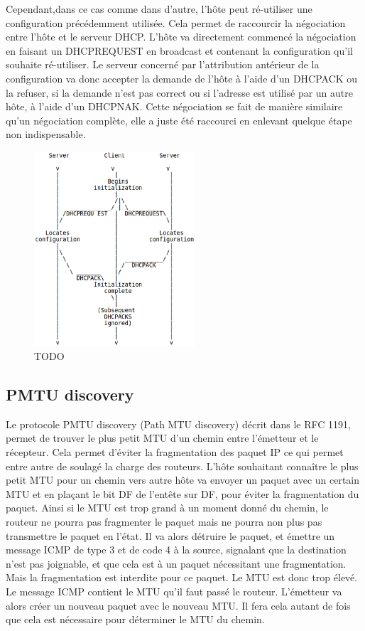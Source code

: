 Cependant,dans ce cas comme dans d'autre, l'hôte peut ré-utiliser une
configuration précédemment utilisée. Cela permet de raccourcir la négociation
entre l'hôte et le serveur DHCP. L'hôte va directement commencé la négociation
en faisant un DHCPREQUEST en broadcast et contenant la configuration qu'il
souhaite ré-utiliser. Le serveur concerné par l'attribution antérieur de la
configuration va donc accepter la demande de l'hôte à l'aide d'un DHCPACK ou la
refuser, si la demande n'est pas correct ou si l'adresse est utilisé par un
autre hôte, à l'aide d'un DHCPNAK.  Cette négociation se fait de manière
similaire qu'un négociation complète, elle a juste été raccourci en enlevant
quelque étape non indispensable.

\begin{figure}
\centering
\includegraphics[width=6cm]{./pics/timeline_dhcp_reuse_add.eps}
\caption{TODO}
\label{fig:timelinedhcpreuseadd}
\end{figure}

\subsection{PMTU discovery}
Le protocole PMTU discovery (Path MTU discovery) décrit dans le RFC 1191\cite{url-RFC-PMTU}, permet de trouver le plus petit MTU d'un chemin entre l'émetteur et le récepteur. Cela permet d'éviter la fragmentation des paquet IP ce qui permet entre autre de soulagé la charge des routeurs.
L'hôte souhaitant connaître le plus petit MTU pour un chemin vers autre hôte va envoyer un paquet avec un certain MTU et en plaçant le bit DF de l'entête sur DF, pour éviter la fragmentation du paquet. Ainsi si le MTU est trop grand à un moment donné du chemin, le routeur ne pourra pas fragmenter le paquet mais ne pourra non plus pas transmettre le paquet en l'état. Il va alors détruire le paquet, et émettre un message ICMP de type 3 et de code 4 à la source, signalant que la destination n'est pas joignable, et que cela est à un paquet nécessitant une fragmentation. Mais la fragmentation est interdite pour ce paquet. Le MTU est donc trop élevé. Le message ICMP contient le MTU qu'il faut passé le routeur.
L'émetteur va alors créer un nouveau paquet avec le nouveau MTU. Il fera cela autant de fois que cela est nécessaire pour déterminer le MTU du chemin.

